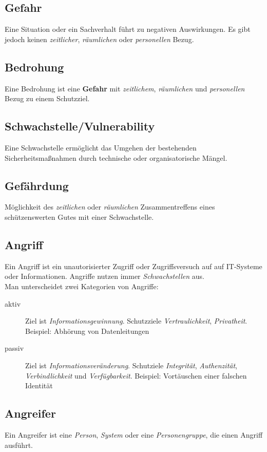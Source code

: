 \documentclass{report}
\begin{document}
\subsection{Gefahr}
Eine Situation oder ein Sachverhalt führt zu negativen Auswirkungen. Es gibt jedoch keinen \textit{zeitlicher}, \textit{räumlichen} oder \textit{personellen} Bezug.
\subsection{Bedrohung}
Eine Bedrohung ist eine \textbf{Gefahr} mit \textit{zeitlichem}, \textit{räumlichen} und \textit{personellen} Bezug zu einem Schutzziel.
\subsection{Schwachstelle/Vulnerability}
Eine Schwachstelle ermöglicht das Umgehen der bestehenden Sicherheitsmaßnahmen durch technische oder organisatorische Mängel.
\subsection{Gefährdung}
Möglichkeit des \textit{zeitlichen} oder \textit{räumlichen} Zusammentreffens eines schützenswerten Gutes mit einer Schwachstelle.
\subsection{Angriff}
Ein Angriff ist ein unautorisierter Zugriff oder Zugriffsversuch auf auf IT-Systeme oder Informationen.
Angriffe nutzen immer \textit{Schwachstellen} aus. \\
Man unterscheidet zwei Kategorien von Angriffe:
\begin{description}
    \item[aktiv] Ziel ist \textit{Informationsgewinnung}. Schutzziele \textit{Vertraulichkeit}, \textit{Privatheit}. Beispiel: Abhörung von Datenleitungen
    \item[passiv] Ziel ist \textit{Informationsveränderung}. Schutziele \textit{Integrität}, \textit{Authenzität}, \textit{Verbindlichkeit} und 
    \textit{Verfügbarkeit}. Beispiel: Vortäuschen einer falschen Identität
\end{description}
\subsection{Angreifer}
Ein Angreifer ist eine \textit{Person}, \textit{System} oder eine \textit{Personengruppe}, die einen Angriff ausführt.
\end{document}
